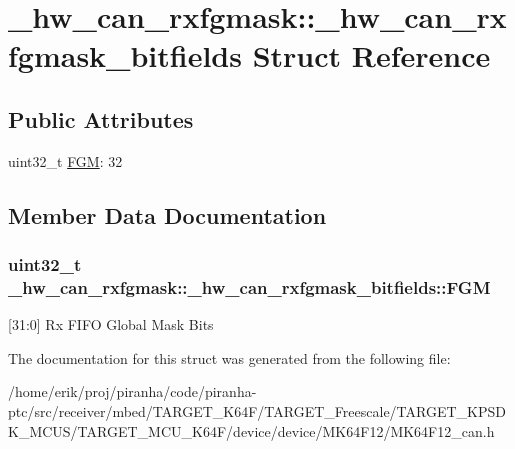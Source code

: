 \hypertarget{struct__hw__can__rxfgmask_1_1__hw__can__rxfgmask__bitfields}{}\section{\+\_\+hw\+\_\+can\+\_\+rxfgmask\+:\+:\+\_\+hw\+\_\+can\+\_\+rxfgmask\+\_\+bitfields Struct Reference}
\label{struct__hw__can__rxfgmask_1_1__hw__can__rxfgmask__bitfields}
\subsection*{Public Attributes}
\begin{DoxyCompactItemize}
\item 
uint32\+\_\+t \hyperlink{struct__hw__can__rxfgmask_1_1__hw__can__rxfgmask__bitfields_a0421fd7bc6b621363e5e512dc732c492}{F\+GM}\+: 32
\end{DoxyCompactItemize}


\subsection{Member Data Documentation}
\subsubsection[{\texorpdfstring{F\+GM}{FGM}}]{\setlength{\rightskip}{0pt plus 5cm}uint32\+\_\+t \+\_\+hw\+\_\+can\+\_\+rxfgmask\+::\+\_\+hw\+\_\+can\+\_\+rxfgmask\+\_\+bitfields\+::\+F\+GM}\hypertarget{struct__hw__can__rxfgmask_1_1__hw__can__rxfgmask__bitfields_a0421fd7bc6b621363e5e512dc732c492}{}\label{struct__hw__can__rxfgmask_1_1__hw__can__rxfgmask__bitfields_a0421fd7bc6b621363e5e512dc732c492}
\mbox{[}31\+:0\mbox{]} Rx F\+I\+FO Global Mask Bits 

The documentation for this struct was generated from the following file\+:\begin{DoxyCompactItemize}
\item 
/home/erik/proj/piranha/code/piranha-\/ptc/src/receiver/mbed/\+T\+A\+R\+G\+E\+T\+\_\+\+K64\+F/\+T\+A\+R\+G\+E\+T\+\_\+\+Freescale/\+T\+A\+R\+G\+E\+T\+\_\+\+K\+P\+S\+D\+K\+\_\+\+M\+C\+U\+S/\+T\+A\+R\+G\+E\+T\+\_\+\+M\+C\+U\+\_\+\+K64\+F/device/device/\+M\+K64\+F12/M\+K64\+F12\+\_\+can.\+h\end{DoxyCompactItemize}
